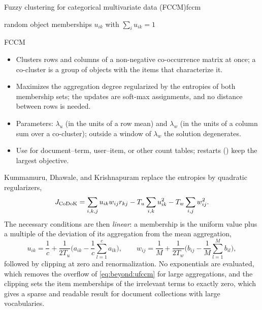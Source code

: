 \begin{algobox}{Fuzzy clustering for categorical multivariate data (FCCM)}{fccm}
\begin{algorithm}[H]
random object memberships $u_{ik}$ with $\sum_i u_{ik}=1$\;
\end{algorithm}
\end{algobox}
\begin{summarybox}{FCCM}
\begin{itemize}
  \item Clusters rows and columns of a non-negative co-occurrence matrix at once; a co-cluster is a group of objects with the items that characterize it.
  \item Maximizes the aggregation degree regularized by the entropies of both membership sets; the updates are soft-max assignments, and no distance between rows is needed.
  \item Parameters: $\lambda_u$ (in the units of a row mean) and $\lambda_w$ (in the units of a column sum over a co-cluster); outside a window of $\lambda_w$ the solution degenerates.
  \item Use for document--term, user--item, or other count tables; restarts () keep the largest objective.
\end{itemize}
\end{summarybox}

Kummamuru, Dhawale, and Krishnapuram \cite{kummamuru:2003:codok} replace the entropies by quadratic regularizers,
\begin{equation}
  J_{\mathrm{CoDoK}}=\sum_{i,k,j}u_{ik}w_{ij}r_{kj}-T_u\sum_{i,k}u_{ik}^2-T_w\sum_{i,j}w_{ij}^2 .
  \label{eq:beyond:Jcodok}
\end{equation}
The necessary conditions are then \emph{linear}: a membership is the uniform value plus a multiple of the deviation of its aggregation from the mean aggregation,
\begin{equation}
  u_{ik}=\frac1c+\frac{1}{2T_u}\Big(a_{ik}-\frac1c\sum_{l=1}^{c}a_{lk}\Big),\qquad
  w_{ij}=\frac1M+\frac{1}{2T_w}\Big(b_{ij}-\frac1M\sum_{l=1}^{M}b_{il}\Big),
  \label{eq:beyond:ucodok}
\end{equation}
followed by clipping at zero and renormalization. No exponentials are evaluated, which removes the overflow of \eqref{eq:beyond:ufccm} for large aggregations, and the clipping sets the item memberships of the irrelevant terms to exactly zero, which gives a sparse and readable result for document collections with large vocabularies.

